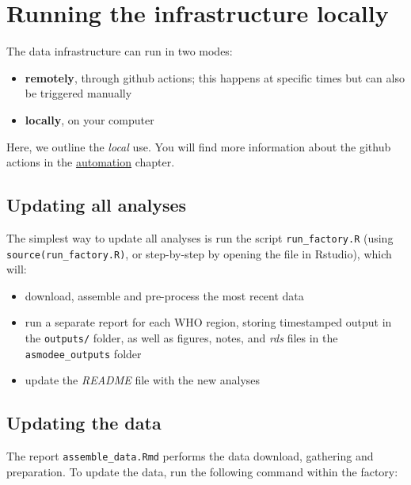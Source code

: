 \documentclass[]{book}
\providecommand{\tightlist}{%
  \setlength{\itemsep}{0pt}\setlength{\parskip}{0pt}}
\begin{document}
\hypertarget{running-the-infrastructure-locally}{%
\section{Running the infrastructure locally}\label{running-the-infrastructure-locally}}

The data infrastructure can run in two modes:

\begin{itemize}
\item
  \textbf{remotely}, through github actions; this happens at specific times but can also
  be triggered manually
\item
  \textbf{locally}, on your computer
\end{itemize}

Here, we outline the \emph{local} use. You will find more information about the
github actions in the \protect\hyperlink{automation}{automation} chapter.

\hypertarget{updating-all-analyses}{%
\subsection{Updating all analyses}\label{updating-all-analyses}}

The simplest way to update all analyses is run the script \texttt{run\_factory.R} (using
\texttt{source(run\_factory.R)}, or step-by-step by opening the file in Rstudio), which
will:

\begin{itemize}
\tightlist
\item
  download, assemble and pre-process the most recent data
\item
  run a separate report for each WHO region, storing timestamped output in the
  \texttt{outputs/} folder, as well as figures, notes, and \emph{rds} files in the
  \texttt{asmodee\_outputs} folder
\item
  update the \emph{README} file with the new analyses
\end{itemize}

\hypertarget{updating-the-data}{%
\subsection{Updating the data}\label{updating-the-data}}

The report \texttt{assemble\_data.Rmd} performs the data download, gathering and
preparation. To update the data, run the following command within the factory:
\end{document}
